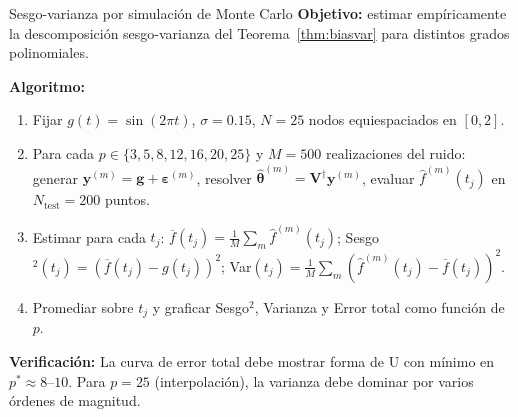 \begin{ejerciciocomp}{Sesgo-varianza por simulación de Monte Carlo}
\label{ejcomp:biasvar_mc}
\textbf{Objetivo:} estimar empíricamente la descomposición
sesgo-varianza del Teorema~\ref{thm:biasvar} para distintos grados
polinomiales.

\medskip\noindent\textbf{Algoritmo:}
\begin{enumerate}
  \item Fijar $g(t) = \sin(2\pi t)$, $\sigma = 0.15$,
        $N = 25$ nodos equiespaciados en $[0, 2]$.
  \item Para cada $p \in \{3, 5, 8, 12, 16, 20, 25\}$ y
        $M = 500$ realizaciones del ruido:
        generar $\bm{y}^{(m)} = \bm{g} + \bm{\varepsilon}^{(m)}$,
        resolver $\hat{\bm{\theta}}^{(m)} =
        \bm{V}^\dagger\bm{y}^{(m)}$, evaluar
        $\hat{f}^{(m)}(t_j)$ en $N_{\text{test}} = 200$ puntos.
  \item Estimar para cada $t_j$:
        $\overline{f}(t_j) = \frac{1}{M}\sum_m \hat{f}^{(m)}(t_j)$;
        Sesgo$^2(t_j) = (\overline{f}(t_j) - g(t_j))^2$;
        Var$(t_j) = \frac{1}{M}\sum_m
        (\hat{f}^{(m)}(t_j) - \overline{f}(t_j))^2$.
  \item Promediar sobre $t_j$ y graficar Sesgo$^2$, Varianza y
        Error total como función de $p$.
\end{enumerate}

\medskip\noindent\textbf{Verificación:}
La curva de error total debe mostrar forma de U con mínimo en
$p^* \approx 8$--$10$. Para $p = 25$ (interpolación), la varianza
debe dominar por varios órdenes de magnitud.
\end{ejerciciocomp}

